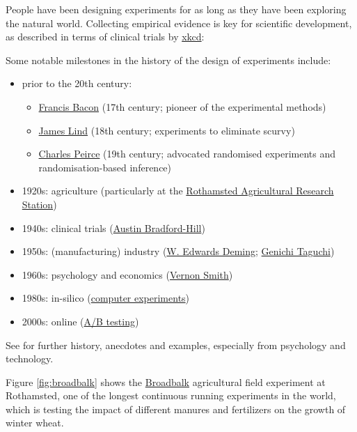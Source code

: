 \documentclass[
]{book}
\providecommand{\tightlist}{%
  \setlength{\itemsep}{0pt}\setlength{\parskip}{0pt}}
\theoremstyle{definition}
\theoremstyle{definition}
\theoremstyle{definition}
\theoremstyle{definition}
\theoremstyle{remark}
\begin{document}
People have been designing experiments for as long as they have been exploring the natural world. Collecting empirical evidence is key for scientific development, as described in terms of clinical trials by \href{https://xkcd.com/2530/}{xkcd}:

Some notable milestones in the history of the design of experiments include:

\begin{itemize}
\tightlist
\item
  prior to the 20th century:

  \begin{itemize}
  \tightlist
  \item
    \href{https://en.wikipedia.org/wiki/Baconian_method}{Francis Bacon} (17th century; pioneer of the experimental methods)
  \item
    \href{https://en.wikipedia.org/wiki/James_Lind}{James Lind} (18th century; experiments to eliminate scurvy)
  \item
    \href{https://en.wikipedia.org/wiki/Charles_Sanders_Peirce\#Probability_and_statistics}{Charles Peirce} (19th century; advocated randomised experiments and randomisation-based inference)
  \end{itemize}
\item
  1920s: agriculture (particularly at the \href{https://www.rothamsted.ac.uk/history-and-heritage}{Rothamsted Agricultural Research Station})
\item
  1940s: clinical trials (\href{https://en.wikipedia.org/wiki/Austin_Bradford_Hill}{Austin Bradford-Hill})
\item
  1950s: (manufacturing) industry (\href{https://en.wikipedia.org/wiki/W._Edwards_Deming}{W. Edwards Deming}; \href{https://en.wikipedia.org/wiki/Genichi_Taguchi}{Genichi Taguchi})
\item
  1960s: psychology and economics (\href{https://en.wikipedia.org/wiki/Vernon_L._Smith}{Vernon Smith})
\item
  1980s: in-silico (\href{https://en.wikipedia.org/wiki/Computer_experiment}{computer experiments})
\item
  2000s: online (\href{https://en.wikipedia.org/wiki/A/B_testing}{A/B testing})
\end{itemize}

See \citet{LB2020} for further history, anecdotes and examples, especially from psychology and technology.

Figure \ref{fig:broadbalk} shows the \href{http://www.era.rothamsted.ac.uk/Broadbalk}{Broadbalk} agricultural field experiment at Rothamsted, one of the longest continuous running experiments in the world, which is testing the impact of different manures and fertilizers on the growth of winter wheat.
\end{document}
